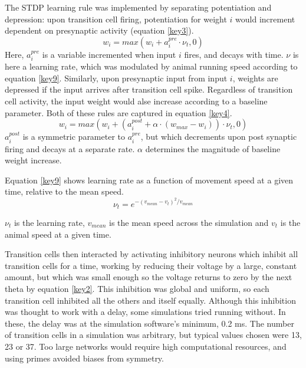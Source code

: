 \documentclass{article}
\begin{document}
    The STDP learning rule was implemented by separating potentiation and depression: upon transition cell firing, potentiation for weight \(i\) would increment dependent on presynaptic activity (equation \ref{key3}).  
    \begin{equation} \label{key3} w_i = max(w_i + a^{pre}_i \cdot \nu_t, 0)\end{equation} 
    Here, \(a^{pre}_i\) is a variable incremented when input \(i\) fires, and decays with time. \(\nu\) is here a learning rate, which was modulated by animal running speed according to equation \ref{key9}.
    Similarly, upon presynaptic input from input \(i\), weights are depressed if the input arrives after transition cell spike. Regardless of transition cell activity, the input weight would alse increase according to a baseline parameter. Both of these rules are captured in equation \ref{key4}. 
    \begin{equation} \label{key4} w_i = max(w_i + (a^{post}_i + \alpha \cdot (w_{max}-w_i)) \cdot \nu_t, 0)\end{equation} 
    \(a^{post}_i\) is a symmetric parameter to \(a^{pre}_i\), but which decrements upon post synaptic firing and decays at a separate rate. \(\alpha\) determines the magnitude of baseline weight increase.

    Equation \ref{key9} shows learning rate as a function of movement speed at a given time, relative to the mean speed.
    \begin{equation} 
        \label{key9}
        \nu_t = e ^ {-(v_{mean} - v_t)^2/v_{mean}}
    \end{equation}

    \(\nu_t\) is the learning rate, \(v_{mean}\) is the mean speed across the simulation and \(v_t\) is the animal speed at a given time.

    Transition cells then interacted by activating inhibitory neurons which inhibit all transition cells for a time, working by reducing their voltage by a large, constant amount, but which was small enough so the voltage returns to zero by the next theta by equation \ref{key2}. This inhibition was global and uniform, so each transition cell inhibited all the others and itself equally. Although this inhibition was thought to work with a delay, some simulations tried running without. In these, the delay was at the simulation software's minimum, 0.2 ms. The number of transition cells in a simulation was arbitrary, but typical values chosen were 13, 23 or 37. Too large networks would require high computational resources, and using primes avoided biases from symmetry.
\end{document}
